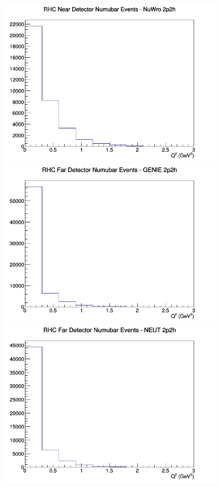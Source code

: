 \documentclass[12pt]{article}
\begin{document}
\begin{figure}[h]
\includegraphics[width=\linewidth]{eff_Q2/LAr/2p2h_RHC_ND_numubar_Q2_NuWro.png}
\endminipage
\newline
{}
\includegraphics[width=\linewidth]{eff_Q2/LAr/2p2h_RHC_FD_numubar_Q2_GENIE.png}
\endminipage
{}
\includegraphics[width=\linewidth]{eff_Q2/LAr/2p2h_RHC_FD_numubar_Q2_NEUT.png}

\end{figure}
\end{document}
